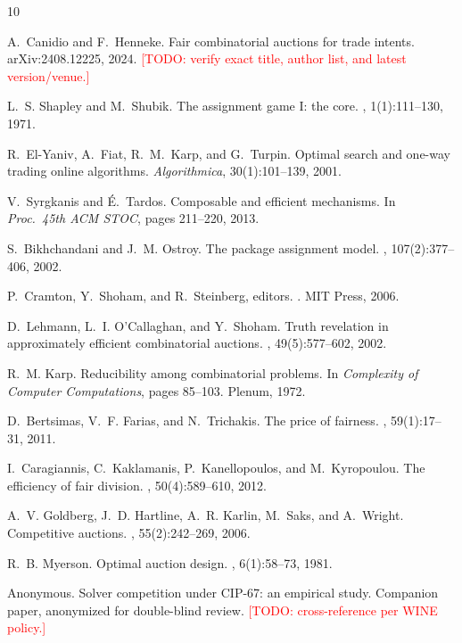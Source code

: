 \documentclass[11pt]{article}
\newcommand{\todo}[1]{\textcolor{red}{[TODO: #1]}}
\theoremstyle{remark}
\begin{document}
\begin{thebibliography}{10}\small

A.~Canidio and F.~Henneke.
\newblock Fair combinatorial auctions for trade intents.
\newblock arXiv:2408.12225, 2024.
\newblock \todo{verify exact title, author list, and latest version/venue.}

L.~S. Shapley and M.~Shubik.
\newblock The assignment game I: the core.
, 1(1):111--130, 1971.

R.~El-Yaniv, A.~Fiat, R.~M.~Karp, and G.~Turpin.
Optimal search and one-way trading online algorithms.
\emph{Algorithmica}, 30(1):101--139, 2001.

V.~Syrgkanis and \'E.~Tardos.
Composable and efficient mechanisms.
In \emph{Proc.\ 45th ACM STOC}, pages 211--220, 2013.

S.~Bikhchandani and J.~M. Ostroy.
\newblock The package assignment model.
, 107(2):377--406, 2002.

P.~Cramton, Y.~Shoham, and R.~Steinberg, editors.
.
\newblock MIT Press, 2006.

D.~Lehmann, L.~I. O'Callaghan, and Y.~Shoham.
\newblock Truth revelation in approximately efficient combinatorial
auctions.
, 49(5):577--602, 2002.

R.~M. Karp.
\newblock Reducibility among combinatorial problems.
\newblock In {\em Complexity of Computer Computations}, pages 85--103.
Plenum, 1972.

D.~Bertsimas, V.~F. Farias, and N.~Trichakis.
\newblock The price of fairness.
, 59(1):17--31, 2011.

I.~Caragiannis, C.~Kaklamanis, P.~Kanellopoulos, and M.~Kyropoulou.
\newblock The efficiency of fair division.
, 50(4):589--610, 2012.

A.~V. Goldberg, J.~D. Hartline, A.~R. Karlin, M.~Saks, and A.~Wright.
\newblock Competitive auctions.
, 55(2):242--269, 2006.

R.~B. Myerson.
\newblock Optimal auction design.
, 6(1):58--73, 1981.

Anonymous.
\newblock Solver competition under CIP-67: an empirical study.
\newblock Companion paper, anonymized for double-blind review.
\newblock \todo{cross-reference per WINE policy.}

\end{thebibliography}
\end{document}
